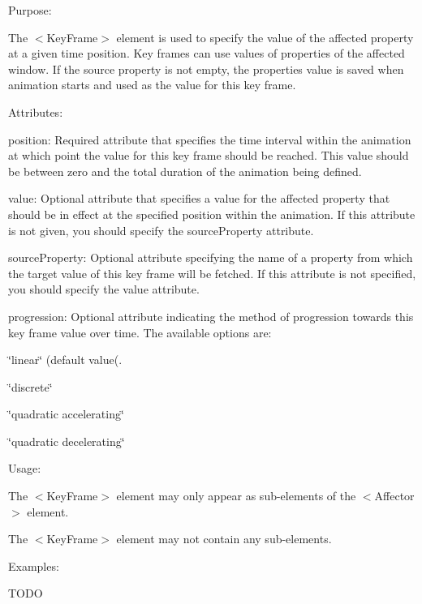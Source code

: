 \begin{DoxyItemize}
\item Purpose\+:
\begin{DoxyItemize}
\item The $<$Key\+Frame$>$ element is used to specify the value of the affected property at a given time position. Key frames can use values of properties of the affected window. If the source property is not empty, the properties value is saved when animation starts and used as the value for this key frame.
\end{DoxyItemize}
\item Attributes\+:
\begin{DoxyItemize}
\item {\ttfamily position\+:} Required attribute that specifies the time interval within the animation at which point the value for this key frame should be reached. This value should be between zero and the total duration of the animation being defined.
\item {\ttfamily value\+:} Optional attribute that specifies a value for the affected property that should be in effect at the specified position within the animation. If this attribute is not given, you should specify the {\ttfamily source\+Property} attribute.
\item {\ttfamily source\+Property\+:} Optional attribute specifying the name of a property from which the target value of this key frame will be fetched. If this attribute is not specified, you should specify the {\ttfamily value} attribute.
\item {\ttfamily progression\+:} Optional attribute indicating the method of progression towards this key frame value over time. The available options are\+:
\begin{DoxyItemize}
\item {\ttfamily \char`\"{}linear\char`\"{}} (default value(.
\item {\ttfamily \char`\"{}discrete\char`\"{}} 
\item {\ttfamily \char`\"{}quadratic accelerating\char`\"{}} 
\item {\ttfamily \char`\"{}quadratic decelerating\char`\"{}} 
\end{DoxyItemize}
\end{DoxyItemize}
\item Usage\+:
\begin{DoxyItemize}
\item The $<$Key\+Frame$>$ element may only appear as sub-\/elements of the $<$Affector$>$ element.
\item The $<$Key\+Frame$>$ element may not contain any sub-\/elements.
\end{DoxyItemize}
\item Examples\+:
\begin{DoxyItemize}
\item T\+O\+DO
\end{DoxyItemize}
\end{DoxyItemize}

